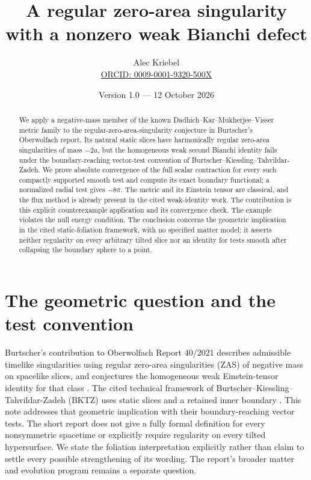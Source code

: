 \documentclass[11pt]{article}
\title{A regular zero-area singularity with a nonzero weak Bianchi defect}
\author{Alec Kriebel\protect\\[3pt]
\small\href{https://orcid.org/0009-0001-9320-500X}{ORCID: 0009-0001-9320-500X}}
\date{Version 1.0 --- 12 October 2026}
\begin{document}
\maketitle

\begin{abstract}
We apply a negative-mass member of the known Dadhich--Kar--Mukherjee--Visser
metric family to the regular-zero-area-singularity conjecture in Burtscher's
Oberwolfach report. Its natural static slices have harmonically regular
zero-area singularities of mass $-2a$, but the homogeneous weak second Bianchi
identity fails under the boundary-reaching vector-test convention of
Burtscher--Kiessling--Tahvildar-Zadeh. We prove absolute convergence of the full
scalar contraction for every such compactly supported smooth test and compute
its exact boundary functional; a normalized radial test gives $-8\pi$.
The metric and its Einstein tensor are classical, and the flux method is
already present in the cited weak-identity work. The contribution is this
explicit counterexample application and its convergence check. The example
violates the null energy condition. The conclusion concerns the geometric
implication in the cited static-foliation framework, with no specified matter
model; it asserts neither regularity on every arbitrary tilted slice nor an
identity for tests smooth after collapsing the boundary sphere to a point.
\end{abstract}

\section{The geometric question and the test convention}

Burtscher's contribution to Oberwolfach Report 40/2021 describes admissible
timelike singularities using regular zero-area singularities (ZAS) of negative
mass on spacelike slices, and conjectures the homogeneous weak Einstein-tensor
identity for that class \cite[pp.~2232--2233]{OWR}. The cited technical framework
of Burtscher--Kiessling--Tahvildar-Zadeh (BKTZ) uses static slices and a retained
inner boundary \cite[Sections~1.3--1.4]{BKTZ}. This note addresses that geometric
implication with their boundary-reaching vector tests. The short report does
not give a fully formal definition for every nonsymmetric spacetime or
explicitly require regularity on every tilted hypersurface. We state the
foliation interpretation explicitly rather than claim to settle every
possible strengthening of its wording. The report's broader matter and
evolution program remains a separate question.
\end{document}
